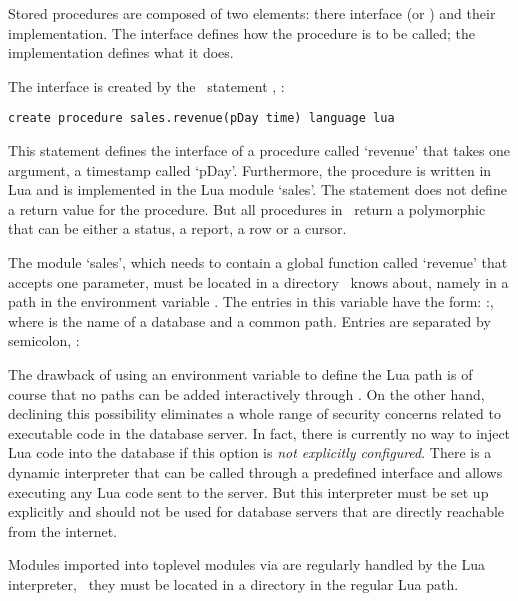 Stored procedures are composed of two
elements: there interface (or )
and their implementation.
The interface defines how the procedure is
to be called; the implementation defines
what it does.

The interface is created by the \sql\ statement
, \eg:

\begin{sqlcode}
\begin{lstlisting}
create procedure sales.revenue(pDay time) language lua 
\end{lstlisting}
\end{sqlcode}

This statement defines the interface of a procedure
called `revenue' that takes one argument, a timestamp
called `pDay'.
Furthermore, the procedure is written in Lua and
is implemented in the Lua module `sales'.
The statement does not define a return value for the procedure.
But all procedures in \nowdb\ return a
polymorphic  that
can be either a status, a report, a row or a cursor.

The  module `sales',
which needs to contain a global function called `revenue'
that accepts one parameter,
must be located in a directory
\nowdb\ knows about, namely 
in a path in the environment variable
.
The entries in this variable have the form:
:,
where  is the name of a database
and  a common  path.
Entries are separated by semicolon, \eg:


The drawback of using an environment variable
to define the Lua path is of course that no paths
can be added interactively through .
On the other hand, declining this possibility 
eliminates a whole range of security concerns related
to executable code in the database server.
In fact, there is currently no way to inject
Lua code into the database
if this option is 
\emph{not explicitly configured}.
There is a dynamic interpreter that can
be called through a predefined interface
and allows executing any Lua code sent
to the server. But this interpreter
must be set up explicitly and should not
be used for database servers that are
directly reachable from the internet.

Modules imported into toplevel modules via 
are regularly handled by the Lua interpreter, \ie\
they must be located in a directory in the regular
Lua path.

